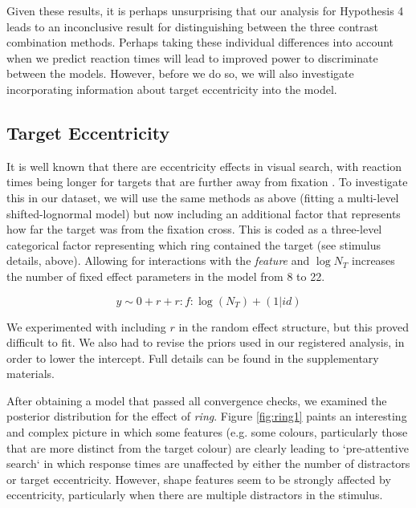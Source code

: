 \documentclass[preprint,12pt,authoryear]{elsarticle}
\begin{document}
Given these results, it is perhaps unsurprising that our analysis for Hypothesis 4 leads to an inconclusive result for distinguishing between the three contrast combination methods. Perhaps taking these individual differences into account when we predict reaction times will lead to improved power to discriminate between the models. However, before we do so, we will also investigate incorporating information about target eccentricity into the model.

\subsection{Target Eccentricity}

It is well known that there are eccentricity effects in visual search, with reaction times being longer for targets that are further away from fixation \citep{carrasco1995eccentricity, wang2017predicting}. To investigate this in our dataset, we will use the same methods as above (fitting a multi-level shifted-lognormal model) but now including an additional factor that represents how far the target was from the fixation cross. This is coded as a three-level categorical factor representing which ring contained the target (see stimulus details, above). Allowing for interactions with the \textit{feature} and $\log{N_T}$ increases the number of fixed effect parameters in the model from 8 to 22. 

\begin{equation}
y \sim 0 + r + r:f:\log(N_T) + (1|id)
\end{equation}

We experimented with including $r$ in the random effect structure, but this proved difficult to fit. We also had to revise the priors used in our registered analysis, in order to lower the intercept. Full details can be found in the supplementary materials. 

After obtaining a model that passed all convergence checks, we examined the posterior distribution for the effect of \textit{ring}. Figure \ref{fig:ring1} paints an interesting and complex picture in which some features (e.g. some colours, particularly those that are more distinct from the target colour) are clearly leading to `pre-attentive search` in which response times are unaffected by either the number of distractors or target eccentricity. However, shape features seem to be strongly affected by eccentricity, particularly when there are multiple distractors in the stimulus.
\end{document}
